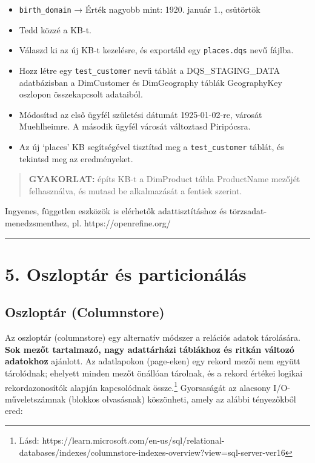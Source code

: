 \documentclass[
  magyar,
]{article}
\begin{document}
\begin{itemize}
\item
  \texttt{birth\_domain} → Érték nagyobb mint: 1920. január 1.,
  csütörtök
\item
  Tedd közzé a KB-t.
\item
  Válaszd ki az új KB-t kezelésre, és exportáld egy \texttt{places.dqs}
  nevű fájlba.
\item
  Hozz létre egy \texttt{test\_customer} nevű táblát a
  DQS\_STAGING\_DATA adatbázisban a DimCustomer és DimGeography táblák
  GeographyKey oszlopon összekapcsolt adataiból.
\item
  Módosítsd az első ügyfél születési dátumát 1925-01-02-re, városát
  Muehlheimre. A második ügyfél városát változtasd Piripócsra.
\item
  Az új `places' KB segítségével tisztítsd meg a \texttt{test\_customer}
  táblát, és tekintsd meg az eredményeket.
\end{itemize}

\begin{quote}
\textbf{GYAKORLAT:} építs KB-t a DimProduct tábla ProductName mezőjét
felhasználva, és mutasd be alkalmazását a fentiek szerint.
\end{quote}

Ingyenes, független eszközök is elérhetők adattisztításhoz és
törzsadat-menedzsmenthez, pl. https://openrefine.org/

\begin{center}\rule{0.5\linewidth}{0.5pt}\end{center}

\section{5. Oszloptár és
particionálás}\label{oszloptuxe1r-uxe9s-particionuxe1luxe1s}

\subsection{Oszloptár (Columnstore)}\label{oszloptuxe1r-columnstore}

Az oszloptár (columnstore) egy alternatív módszer a relációs adatok
tárolására. \textbf{Sok mezőt tartalmazó, nagy adattárházi táblákhoz és
ritkán változó adatokhoz} ajánlott. Az adatlapokon (page-eken) egy
rekord mezői nem együtt tárolódnak; ehelyett minden mezőt önállóan
tárolnak, és a rekord értékei logikai rekordazonosítók alapján
kapcsolódnak össze.\footnote{Lásd:
  https://learn.microsoft.com/en-us/sql/relational-databases/indexes/columnstore-indexes-overview?view=sql-server-ver16}
Gyorsaságát az alacsony I/O-műveletszámnak (blokkos olvasásnak)
köszönheti, amely az alábbi tényezőkből ered:
\end{document}
